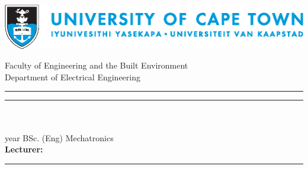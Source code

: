 \begin{center}
\begin{minipage}{1\textwidth}
\begin{center}
	
\begin{center}
\includegraphics[width=1\linewidth]{"UCThoriz"}
\end{center}
\vskip20pt
\LARGE{Faculty of Engineering and the Built Environment}\\
Department of Electrical Engineering\\
\coursecode
\vskip80pt
\hrule
\vskip20pt
\Huge\thetitle
\vskip20pt
\hrule
\vskip20pt
\Large\theauthor\\
\Large\studentnum\\
 year BSc. (Eng) Mechatronics\\
\textbf{Lecturer:} \staffmember
\vskip20pt
\hrule
\vskip20pt
\thedate\\
\end{center}
\end{minipage}
\end{center}

\newpage 